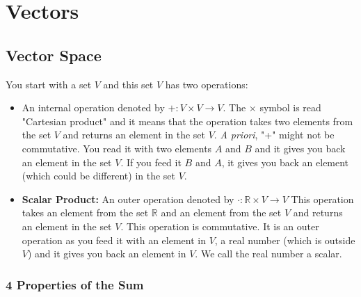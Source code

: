 \setchapterabstract{}
\chapter{Vectors}
\vspace{-1.5cm}

{\chaptoc\noindent\begin{minipage}[inner sep=0,outer sep=0]{0.9\linewidth}\section{Vector Space}\end{minipage}}

    You start with a set $V$ and this set $V$ has two operations:
        \begin{itemize}
            \item An internal operation denoted by $+: V \times V \rightarrow V$.
                The \(\times\) symbol is read "Cartesian product" and it means that the operation takes two elements from the set $V$ and returns an element in the set $V$.
                \textit{A priori}, "+" might not be commutative.
                You read it with two elements $A$ and $B$ and it gives you back an element in the set $V$.
                If you feed it $B$ and $A$, it gives you back an element (which could be different) in the set $V$.
            \item \textbf{Scalar Product:} An outer operation denoted by $\cdot: \mathbb{R} \times V \rightarrow V$
                This operation takes an element from the set $\mathbb{R}$ and an element from the set $V$ and returns an element in the set $V$.
                This operation is commutative.
                It is an outer operation as you feed it with an element in $V$, a real number (which is outside $V$) and it gives you back an element in $V$.
                We call the real number a scalar.
        \end{itemize}



\subsection{4 Properties of the Sum}


